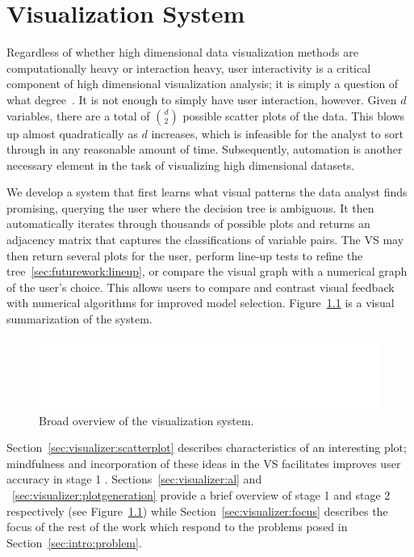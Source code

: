 \chapter{Visualization System \label{ch:visualizer}}

Regardless of whether high dimensional data visualization methods are
computationally heavy or interaction heavy, user interactivity is a critical
component of high dimensional visualization analysis; it is simply a
question of what degree~\cite{lius2016}. It is not enough to simply have user 
interaction, however. Given $d$ variables, there are a total of $d\choose 2$ 
possible scatter plots of the data. This blows up almost quadratically as $d$ 
increases, which is infeasible for the analyst to sort through in any 
reasonable amount of time. Subsequently, automation is another necessary 
element in the task of visualizing high dimensional datasets.

We develop a system that first learns what visual patterns the data analyst 
finds promising, querying the user where the decision tree is ambiguous. It 
then automatically iterates through thousands
of possible plots and returns an adjacency matrix that captures the 
classifications of variable pairs. The VS may then return several plots for the 
user, perform line-up tests to refine the tree~\ref{sec:futurework:lineup}, or 
compare the visual graph with a numerical graph of the user's choice. This 
allows users to compare and contrast visual feedback with numerical
algorithms for improved model selection. Figure~\ref{fig:visualizer:vs} 
is a visual summarization of the system.
       
\begin{figure}[htb]
	\begin{center}
		\includegraphics[width=1\linewidth]{ch-visualizer/figures/vs}
		\caption[Broad overview of the visualization system.]{Broad overview of 
		the visualization system.}
		\label{fig:visualizer:vs}
	\end{center}
\end{figure}

Section~\ref{sec:visualizer:scatterplot} describes characteristics of an 
interesting plot; mindfulness and incorporation of these ideas in the VS 
facilitates improves user accuracy in stage 1 . 
Sections~\ref{sec:visualizer:al} and ~\ref{sec:visualizer:plotgeneration} 
provide a brief overview of stage 1 and stage 2 respectively (see 
Figure~\ref{fig:visualizer:vs}) while 
Section~\ref{sec:visualizer:focus} describes the focus of the rest of the work 
which respond to the problems posed in Section~\ref{sec:intro:problem}.





